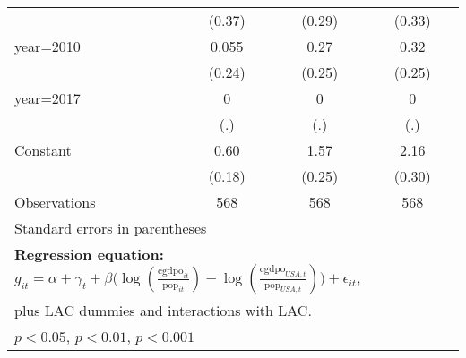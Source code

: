 \begin{table}[htbp]
\begin{tabular}{l*{3}{c}}
                &   (0.37)         &   (0.29)         &   (0.33)         \\
\addlinespace
year=2010       &    0.055         &     0.27         &     0.32         \\
                &   (0.24)         &   (0.25)         &   (0.25)         \\
\addlinespace
year=2017       &        0         &        0         &        0         \\
                &      (.)         &      (.)         &      (.)         \\
\addlinespace
Constant        &     0.60\sym{**} &     1.57\sym{***}&     2.16\sym{***}\\
                &   (0.18)         &   (0.25)         &   (0.30)         \\
\midrule
Observations    &      568         &      568         &      568         \\
\bottomrule
\multicolumn{4}{l}{\footnotesize Standard errors in parentheses}\\
\multicolumn{4}{l}{\footnotesize \textbf{Regression equation:} \(g_{it} = \alpha + \gamma_t + \beta \big(\log (\frac{\textrm{cgdpo}_{it}}{\textrm{pop}_{it}} ) - \log (\frac{\textrm{cgdpo}_{USA,t}}{\textrm{pop}_{USA,t}}  ) \big) + \epsilon_{it}\), }\\
\multicolumn{4}{l}{\footnotesize plus LAC dummies and interactions with LAC.}\\
\multicolumn{4}{l}{\footnotesize \sym{*} \(p<0.05\), \sym{**} \(p<0.01\), \sym{***} \(p<0.001\)}\\
\end{tabular}
\end{table}
